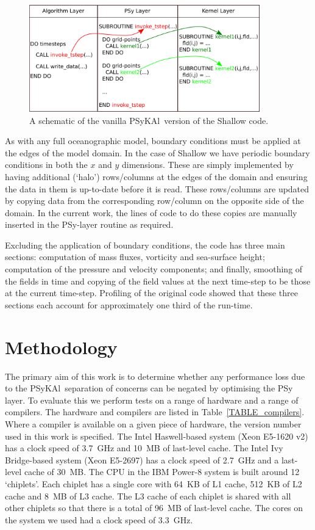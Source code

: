 \documentclass{IOS-Book-Article}
\newcommand{\psykal}{{PS}y{KA}l\ }
\begin{document}
\begin{figure}
\centering
\includegraphics[width=100mm]{psykal_shallow}
\caption{A schematic of the vanilla \psykal version of the Shallow code.}
\label{FIG_psykal_shallow_structure}
\end{figure}

As with any full oceanographic model, boundary conditions must be
applied at the edges of the model domain. In the case of Shallow we
have periodic boundary conditions in both the $x$ and $y$ dimensions.
These are simply implemented by having additional (`halo')
rows/columns at the edges of the domain and ensuring the data in them
is up-to-date before it is read. These rows/columns are updated by
copying data from the corresponding row/column on the opposite side of
the domain. In the current work, the lines of code to do these copies
are manually inserted in the PSy-layer routine as required.

Excluding the application of boundary conditions, the code has three
main sections: computation of mass fluxes, vorticity and sea-surface
height; computation of the pressure and velocity components; and
finally, smoothing of the fields in time and copying of the field
values at the next time-step to be those at the current
time-step. Profiling of the original code showed that these three
sections each account for approximately one third of the run-time.

\section{Methodology}

The primary aim of this work is to determine whether any performance
loss due to the \psykal separation of concerns can be negated by
optimising the PSy layer. To evaluate this we perform tests on a range
of hardware and a range of compilers. The hardware and compilers are
listed in Table~\ref{TABLE_compilers}. Where a compiler is available
on a given piece of hardware, the version number used in this work is
specified.
%
The Intel Haswell-based system (Xeon E5-1620 v2) has a clock speed of
3.7~GHz and 10~MB of last-level cache. The Intel Ivy Bridge-based
system (Xeon E5-2697) has a clock speed of 2.7~GHz and a last-level
cache of 30~MB. The CPU in the IBM Power-8 system is built around 12
`chiplets'. Each chiplet has a single core with 64~KB of L1 cache,
512~KB of L2 cache and 8~MB of L3 cache. The L3 cache of each chiplet
is shared with all other chiplets so that there is a total of 96~MB of
last-level cache. The cores on the system we used had a clock speed of
3.3~GHz.
\end{document}

